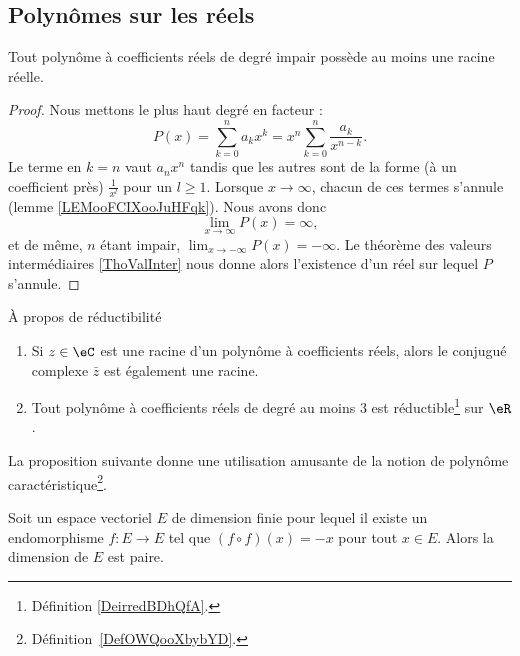 \subsection{Polynômes sur les réels}

\begin{proposition}     \label{PROPooJKYJooFqbQMr}
	Tout polynôme à coefficients réels de degré impair possède au moins une racine réelle.
\end{proposition}

\begin{proof}
	Nous mettons le plus haut degré en facteur :
	\begin{equation}
		P(x)=\sum_{k=0}^na_kx^k=x^n\sum_{k=0}^n\frac{ a_k }{ x^{n-k} }.
	\end{equation}
	Le terme en \( k=n\) vaut \( a_nx^n\) tandis que les autres sont de la forme (à un coefficient près) \( \frac{1}{ x^l }\) pour un \( l\geq 1\). Lorsque \( x\to \infty\), chacun de ces termes s'annule (lemme \ref{LEMooFCIXooJuHFqk}). Nous avons donc
	\begin{equation}
		\lim_{x\to \infty} P(x)=\infty,
	\end{equation}
	et de même, \( n\) étant impair, \( \lim_{x\to -\infty} P(x)=-\infty\). Le théorème des valeurs intermédiaires \ref{ThoValInter} nous donne alors l'existence d'un réel sur lequel \( P\) s'annule.
\end{proof}

\begin{proposition}	\label{PROPooARLAooMNnNsz}
	À propos de réductibilité
	\begin{enumerate}
		\item
		      Si \( z\in \eC\) est une racine d'un polynôme à coefficients réels, alors le conjugué complexe \( \bar z\) est également une racine.
		\item
		      Tout polynôme à coefficients réels de degré au moins \( 3\) est réductible\footnote{Définition \ref{DeirredBDhQfA}.} sur \( \eR\).
	\end{enumerate}
\end{proposition}


La proposition suivante donne une utilisation amusante de la notion de polynôme caractéristique\footnote{Définition~\ref{DefOWQooXbybYD}.}.
\begin{proposition}      \label{PROPooKJWOooOjSFaA}
	Soit un espace vectoriel \( E\) de dimension finie pour lequel il existe un endomorphisme \( f\colon E\to E\) tel que \( (f\circ f)(x)=-x\) pour tout \( x\in E\). Alors la dimension de \( E\) est paire.
\end{proposition}

